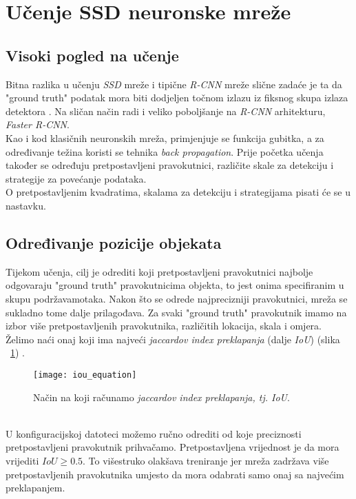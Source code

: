 \section{Učenje SSD neuronske mreže}
\subsection{Visoki pogled na učenje}
Bitna razlika u učenju \emph{SSD} mreže i tipične \emph{R-CNN} mreže slične zadaće je ta da "ground truth" podatak mora biti dodjeljen točnom izlazu iz fiksnog skupa izlaza detektora \cite{liu2016ssd}.
Na sličan način radi i veliko poboljšanje na \emph{R-CNN} arhitekturu, \emph{Faster R-CNN}. \\
Kao i kod klasičnih neuronskih mreža, primjenjuje se funkcija gubitka, a za određivanje težina koristi se tehnika \emph{back propagation}.
Prije početka učenja također se određuju pretpostavljeni pravokutnici, različite skale za detekciju i strategije za povećanje podataka. \\
O pretpostavljenim kvadratima, skalama za detekciju i strategijama pisati će se u nastavku.
\subsection{Određivanje pozicije objekata}
Tijekom učenja, cilj je odrediti koji pretpostavljeni pravokutnici najbolje odgovaraju "ground truth" pravokutnicima objekta, to jest onima specifiranim u skupu podržavamotaka.
Nakon što se odrede najprecizniji pravokutnici, mreža se sukladno tome dalje prilagođava.
Za svaki "ground truth" pravokutnik imamo na izbor više pretpostavljenih pravokutnika, različitih lokacija, skala i omjera.
Želimo naći onaj koji ima najveći \emph{jaccardov index preklapanja} (dalje \emph{IoU}) (slika ~\ref{fig:JaccardIndex}) \cite{SSD}.
\begin{figure}[h!]
	\centering
	\texttt{[image: iou\_equation]}
	 \caption{Način na koji računamo \emph{jaccardov index preklapanja, tj. IoU}.}
 	 \label{fig:JaccardIndex}
\end{figure} \\
U konfiguracijskoj datoteci možemo ručno odrediti od koje preciznosti pretpostavljeni pravokutnik prihvačamo.
Pretpostavljena vrijednost je da mora vrijediti $IoU \geq 0.5$.
To višestruko olakšava treniranje jer mreža zadržava više pretpostavljenih pravokutnika umjesto da mora odabrati samo onaj sa najvećim preklapanjem.

